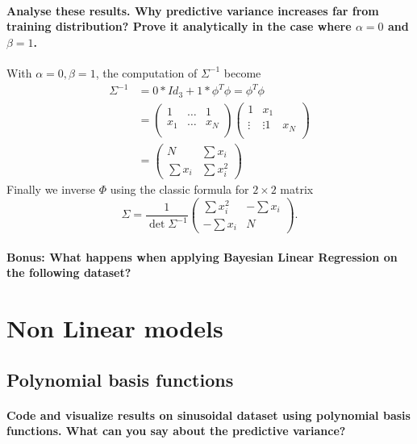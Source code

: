\paragraph*{Analyse these results. Why predictive variance increases far from training distribution? Prove it analytically in the case where $\alpha=0$ and $\beta=1$.}
With $\alpha = 0, \beta = 1$, the computation of $\Sigma^{-1}$ become 
\begin{align*}
    \Sigma ^{-1} 
        &= 0*Id_3 + 1* \phi ^T \phi = \phi ^T \phi \\ 
        &= \begin{pmatrix}
            1 & \dots & 1 \\
            x_1 & \dots & x_N \\
        \end{pmatrix} \begin{pmatrix}
            1 & x_1 \\
            \vdots & \vdots 
            1 & x_N \\
        \end{pmatrix} \\
        &= \begin{pmatrix}
            N & \sum x_i \\
            \sum x_i & \sum x_i^2
        \end{pmatrix}
\end{align*}
Finally we inverse $ \Phi  $ using the classic formula for $ 2 \times 2 $ matrix 
\[
    \Sigma = \frac{1}{\det \Sigma ^{-1}} \begin{pmatrix}
        \sum x_i^2 & - \sum x_i \\
        - \sum x_i & N
    \end{pmatrix}
.\]

\paragraph*{Bonus: What happens when applying Bayesian Linear Regression on the following dataset?}

\section{Non Linear models}

\subsection{Polynomial basis functions}
\paragraph*{Code and visualize results on sinusoidal dataset using polynomial basis functions. What can you say about the predictive variance?}


